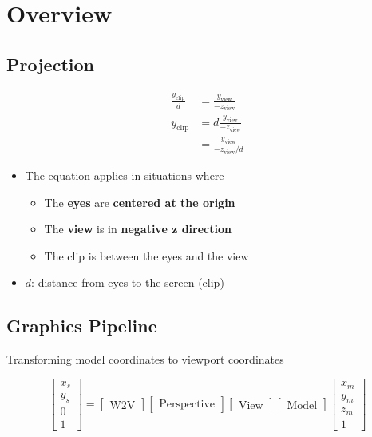 \chapter{Overview}

\section{Projection}

  \begin{align}
    \frac{y_{\text{clip}}}{d} &= \frac{y_{\text{view}}}{-z_{\text{view}}} \\
    y_{\text{clip}}
    &= d\frac{y_{\text{view}}}{-z_{\text{view}}} \\
    &= \frac{y_{\text{view}}}{-z_{\text{view}} / d}
  \end{align}

  \begin{itemize}
    \item The equation applies in situations where
    \begin{itemize}
      \item The \textbf{eyes} are \textbf{centered at the origin}
      \item The \textbf{view} is in \textbf{negative z direction}
      \item The clip is between the eyes and the view
    \end{itemize}
    \item $ d $: distance from eyes to the screen (clip)
  \end{itemize}

\section{Graphics Pipeline}

  Transforming model coordinates to viewport coordinates

  \begin{equation}
    \begin{bmatrix}
      x_{s} \\
      y_{s} \\
      0 \\
      1
    \end{bmatrix}
    =
    \begin{bmatrix}
      \text{W2V}
    \end{bmatrix}
    \begin{bmatrix}
      \text{Perspective}
    \end{bmatrix}
    \begin{bmatrix}
      \text{View}
    \end{bmatrix}
    \begin{bmatrix}
      \text{Model}
    \end{bmatrix}
    \begin{bmatrix}
      x_{m} \\
      y_{m} \\
      z_{m} \\
      1
    \end{bmatrix}
  \end{equation}

